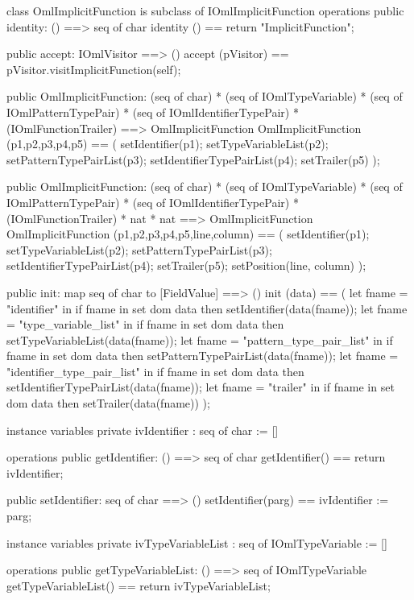 \begin{vdm_al}
class OmlImplicitFunction is subclass of IOmlImplicitFunction
operations
  public identity: () ==> seq of char
  identity () == return "ImplicitFunction";

  public accept: IOmlVisitor ==> ()
  accept (pVisitor) == pVisitor.visitImplicitFunction(self);

  public OmlImplicitFunction:
    (seq of char) *
    (seq of IOmlTypeVariable) *
    (seq of IOmlPatternTypePair) *
    (seq of IOmlIdentifierTypePair) *
    (IOmlFunctionTrailer) ==> OmlImplicitFunction
  OmlImplicitFunction (p1,p2,p3,p4,p5) == 
    ( setIdentifier(p1);
      setTypeVariableList(p2);
      setPatternTypePairList(p3);
      setIdentifierTypePairList(p4);
      setTrailer(p5) );

  public OmlImplicitFunction:
    (seq of char) *
    (seq of IOmlTypeVariable) *
    (seq of IOmlPatternTypePair) *
    (seq of IOmlIdentifierTypePair) *
    (IOmlFunctionTrailer) *
    nat *
    nat ==> OmlImplicitFunction
  OmlImplicitFunction (p1,p2,p3,p4,p5,line,column) == 
    ( setIdentifier(p1);
      setTypeVariableList(p2);
      setPatternTypePairList(p3);
      setIdentifierTypePairList(p4);
      setTrailer(p5);
      setPosition(line, column) );

  public init: map seq of char to [FieldValue] ==> ()
  init (data) ==
    ( let fname = "identifier" in
        if fname in set dom data
        then setIdentifier(data(fname));
      let fname = "type_variable_list" in
        if fname in set dom data
        then setTypeVariableList(data(fname));
      let fname = "pattern_type_pair_list" in
        if fname in set dom data
        then setPatternTypePairList(data(fname));
      let fname = "identifier_type_pair_list" in
        if fname in set dom data
        then setIdentifierTypePairList(data(fname));
      let fname = "trailer" in
        if fname in set dom data
        then setTrailer(data(fname)) );

instance variables
  private ivIdentifier : seq of char := []

operations
  public getIdentifier: () ==> seq of char
  getIdentifier() == return ivIdentifier;

  public setIdentifier: seq of char ==> ()
  setIdentifier(parg) == ivIdentifier := parg;

instance variables
  private ivTypeVariableList : seq of IOmlTypeVariable := []

operations
  public getTypeVariableList: () ==> seq of IOmlTypeVariable
  getTypeVariableList() == return ivTypeVariableList;


\end{vdm_al}
